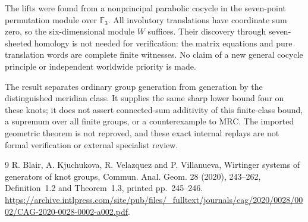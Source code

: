 \documentclass[11pt]{article}
\newcommand{\F}{\mathbb F}
\begin{document}
The lifts were found from a nonprincipal parabolic cocycle in the
seven-point permutation module over $\F_3$.
All involutory translations have coordinate sum zero, so the
six-dimensional module $W$ suffices.
Their discovery through seven-sheeted homology is not needed for
verification: the matrix equations and pure translation words are
complete finite witnesses. No claim of a new general cocycle
principle or independent worldwide priority is made.

The result separates ordinary group generation from generation by
the distinguished meridian class. It supplies the same sharp lower
bound four on these knots; it does not assert connected-sum
additivity of this finite-class bound, a supremum over all finite
groups, or a counterexample to MRC.
The imported geometric theorem is not reproved, and these exact
internal replays are not formal verification or external specialist
review.

\begin{thebibliography}{9}
R. Blair, A. Kjuchukova, R. Velazquez and P. Villanueva,
Wirtinger systems of generators of knot groups,
Commun. Anal. Geom. 28 (2020), 243--262,
Definition~1.2 and Theorem~1.3, printed pp.~245--246.
\url{https://archive.intlpress.com/site/pub/files/_fulltext/journals/cag/2020/0028/0002/CAG-2020-0028-0002-a002.pdf}.
\end{thebibliography}
\end{document}
